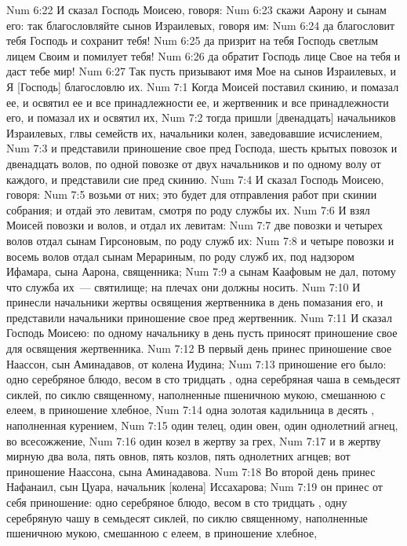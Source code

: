 \rsbpar\vs Num 6:22 И сказал Господь Моисею, говоря:
\vs Num 6:23 скажи Аарону и сынам его: так благословляйте сынов Израилевых, говоря им:
\vs Num 6:24 да благословит тебя Господь и сохранит тебя!
\vs Num 6:25 да призрит на тебя Господь светлым лицем Своим и помилует тебя!
\vs Num 6:26 да обратит Господь лице Свое на тебя и даст тебе мир!
\vs Num 6:27 Так пусть призывают имя Мое на сынов Израилевых, и Я [Господь] благословлю их.
\vs Num 7:1 Когда Моисей поставил скинию, и помазал ее, и освятил ее и все принадлежности ее, и жертвенник и все принадлежности его, и помазал их и освятил их,
\vs Num 7:2 тогда пришли [двенадцать] начальников Израилевых, глвы семейств их, начальники колен, заведовавшие исчислением,
\vs Num 7:3 и представили приношение свое пред Господа, шесть крытых повозок и двенадцать волов, по одной повозке от двух начальников и по одному волу от каждого, и представили сие пред скинию.
\rsbpar\vs Num 7:4 И сказал Господь Моисею, говоря:
\vs Num 7:5 возьми от них; это будет для отправления работ при скинии собрания; и отдай это левитам, смотря по роду службы их.
\vs Num 7:6 И взял Моисей повозки и волов, и отдал их левитам:
\vs Num 7:7 две повозки и четырех волов отдал сынам Гирсоновым, по роду служб их:
\vs Num 7:8 и четыре повозки и восемь волов отдал сынам Мерариным, по роду служб их, под надзором Ифамара, сына Аарона, священника;
\vs Num 7:9 а сынам Каафовым не дал, потому что служба их~---  святилище; на плечах они должны носить.
\vs Num 7:10 И принесли начальники жертвы освящения жертвенника в день помазания его, и представили начальники приношение свое пред жертвенник.
\rsbpar\vs Num 7:11 И сказал Господь Моисею: по одному начальнику в день пусть приносят приношение свое для освящения жертвенника.
\vs Num 7:12 В первый день принес приношение свое Наассон, сын Аминадавов, от колена Иудина;
\vs Num 7:13 приношение его было: одно серебряное блюдо, весом в сто тридцать , одна серебряная чаша в семьдесят сиклей, по сиклю священному, наполненные пшеничною мукою, смешанною с елеем, в приношение хлебное,
\vs Num 7:14 одна золотая кадильница в десять , наполненная курением,
\vs Num 7:15 один телец, один овен, один однолетний агнец, во всесожжение,
\vs Num 7:16 один козел в жертву за грех,
\vs Num 7:17 и в жертву мирную два вола, пять овнов, пять козлов, пять однолетних агнцев; вот приношение Наассона, сына Аминадавова.
\vs Num 7:18 Во второй день принес Нафанаил, сын Цуара, начальник [колена] Иссахарова;
\vs Num 7:19 он принес от себя приношение: одно серебряное блюдо, весом в сто тридцать , одну серебряную чашу в семьдесят сиклей, по сиклю священному, наполненные пшеничною мукою, смешанною с елеем, в приношение хлебное,
